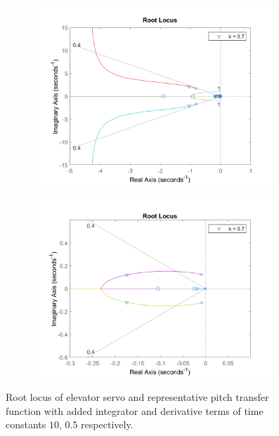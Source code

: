 \documentclass{article}
\begin{document}
\begin{figure}[H]
    \centering
    \begin{subfigure}{0.45\textwidth}
        \centering
        \includegraphics[width=0.99\textwidth]{figures/pitch_autopilot_locus_TiTd.png}
    \end{subfigure}
    \begin{subfigure}{0.45\textwidth}
        \centering
        \includegraphics[width=0.99\textwidth]{figures/pitch_autopilot_locus_TiTd_zoomed.png}
    \end{subfigure}
    \caption{Root locus of elevator servo and representative pitch transfer function \cite{rep} with added integrator and derivative terms of time constants $10$, $0.5$ respectively.}
    \label{fig:pitch_autopilot_compensated_locus}
\end{figure}
\end{document}
